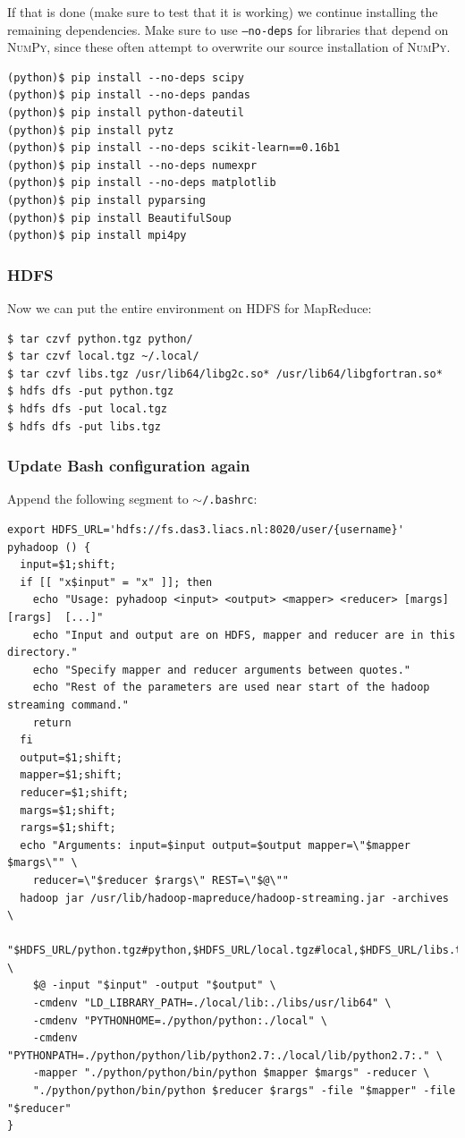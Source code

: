 \documentclass{article}
\begin{document}
If that is done (make sure to test that it is working) we continue installing 
the remaining dependencies. Make sure to use \texttt{--no-deps} for libraries 
that depend on \textsc{NumPy}, since these often attempt to overwrite our 
source installation of \textsc{NumPy}.

\begin{verbatim}
(python)$ pip install --no-deps scipy
(python)$ pip install --no-deps pandas
(python)$ pip install python-dateutil
(python)$ pip install pytz
(python)$ pip install --no-deps scikit-learn==0.16b1
(python)$ pip install --no-deps numexpr
(python)$ pip install --no-deps matplotlib
(python)$ pip install pyparsing
(python)$ pip install BeautifulSoup
(python)$ pip install mpi4py
\end{verbatim}

\subsubsection{HDFS}\label{app:hdfs}
Now we can put the entire environment on HDFS for MapReduce:

\begin{verbatim}
$ tar czvf python.tgz python/
$ tar czvf local.tgz ~/.local/
$ tar czvf libs.tgz /usr/lib64/libg2c.so* /usr/lib64/libgfortran.so*
$ hdfs dfs -put python.tgz
$ hdfs dfs -put local.tgz
$ hdfs dfs -put libs.tgz
\end{verbatim}

\subsubsection{Update Bash configuration again}\label{app:update-bashrc-again}

Append the following segment to \texttt{$\sim$/.bashrc}:

\begin{verbatim}
export HDFS_URL='hdfs://fs.das3.liacs.nl:8020/user/{username}'
pyhadoop () {
  input=$1;shift;
  if [[ "x$input" = "x" ]]; then
    echo "Usage: pyhadoop <input> <output> <mapper> <reducer> [margs] [rargs]  [...]"
    echo "Input and output are on HDFS, mapper and reducer are in this directory."
    echo "Specify mapper and reducer arguments between quotes."
    echo "Rest of the parameters are used near start of the hadoop streaming command."
    return
  fi
  output=$1;shift;
  mapper=$1;shift;
  reducer=$1;shift;
  margs=$1;shift;
  rargs=$1;shift;
  echo "Arguments: input=$input output=$output mapper=\"$mapper $margs\"" \
    reducer=\"$reducer $rargs\" REST=\"$@\""
  hadoop jar /usr/lib/hadoop-mapreduce/hadoop-streaming.jar -archives \
    "$HDFS_URL/python.tgz#python,$HDFS_URL/local.tgz#local,$HDFS_URL/libs.tgz#libs" \
    $@ -input "$input" -output "$output" \
    -cmdenv "LD_LIBRARY_PATH=./local/lib:./libs/usr/lib64" \
    -cmdenv "PYTHONHOME=./python/python:./local" \
    -cmdenv "PYTHONPATH=./python/python/lib/python2.7:./local/lib/python2.7:." \
    -mapper "./python/python/bin/python $mapper $margs" -reducer \
    "./python/python/bin/python $reducer $rargs" -file "$mapper" -file "$reducer"
}
\end{verbatim}
\end{document}
